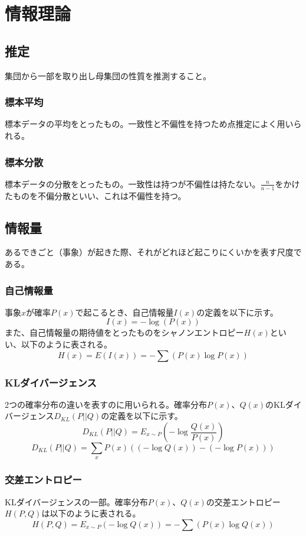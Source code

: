 \documentclass[b5paper,12pt]{jarticle}
\begin{document}
\section{情報理論}

\subsection{推定}
集団から一部を取り出し母集団の性質を推測すること。
\subsubsection{標本平均}
標本データの平均をとったもの。一致性と不偏性を持つため点推定によく用いられる。
\subsubsection{標本分散}
標本データの分散をとったもの。一致性は持つが不偏性は持たない。$\frac{n}{n-1}$をかけたものを不偏分散といい、これは不偏性を持つ。


\subsection{情報量}
あるできごと（事象）が起きた際、それがどれほど起こりにくいかを表す尺度である。
\subsubsection{自己情報量}
事象$x$が確率$P(x)$で起こるとき、自己情報量$I(x)$の定義を以下に示す。
\[
    I(x)=-\log(P(x))
\]
また、自己情報量の期待値をとったものをシャノンエントロピー$H(x)$といい、以下のように表される。
\[
    H(x)=E(I(x))=-\sum(P(x)\log P(x))
\]
\subsubsection{KLダイバージェンス}
2つの確率分布の違いを表すのに用いられる。確率分布$P(x)$、$Q(x)$のKLダイバージェンス$D_{KL}(P||Q)$の定義を以下に示す。
\[
    D_{KL}(P||Q)=E_{x\sim P}(-\log \frac{Q(x)}{P(x)})
\]
\[
    D_{KL}(P||Q)=\sum_x P(x) ((-\log Q(x))-(-\log P(x)))
\]

\subsubsection{交差エントロピー}
KLダイバージェンスの一部。確率分布$P(x)$、$Q(x)$の交差エントロピー$H(P,Q)$は以下のように表される。
\[
    H(P,Q)=E_{x\sim P}(-\log Q(x))=-\sum(P(x)\log Q(x))
\]
\end{document}
